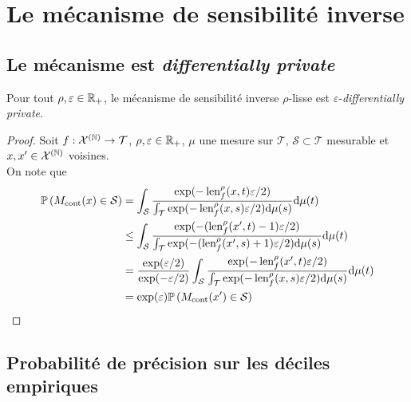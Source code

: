 \section{Le mécanisme de sensibilité inverse}

\subsection{Le mécanisme est \textit{differentially private}}\label{ISDP}

\begin{theorem}
    Pour tout \(\rho,\varepsilon \in \mathbb{R}_+\), le mécanisme de sensibilité inverse \(\rho\)-lisse est \(\varepsilon\)-\textit{differentially private}.
\end{theorem}


\begin{proof}
    Soit \(f : \mathcal X^{(\mathbb{N})} \to \mathcal T\), \(\rho, \varepsilon \in \mathbb{R}_+\), \(\mu\) une mesure sur \(\mathcal T\), \(\mathcal S \subset \mathcal T\) mesurable et \(x,x' \in \mathcal X^{(\mathbb{N})}\) voisines. \\

    On note que 
    \begin{align*}
        \mathbb P\left( M_{\text{cont}}(x) \in \mathcal S \right) & = \int_\mathcal S \dfrac{\exp(-\operatorname{len}_f^\rho(x, t)\varepsilon/2)}{\int_\mathcal T \exp(-\operatorname{len}_f^\rho(x, s)\varepsilon/2)\mathrm{d} \mu(s)}    \mathrm{d} \mu(t)\\
        & \leq \int_\mathcal S \dfrac{\exp(-(\operatorname{len}_f^\rho(x', t)-1)\varepsilon/2)}{\int_\mathcal T \exp(-(\operatorname{len}_f^\rho(x', s)+1)\varepsilon/2)\mathrm{d} \mu(s)}    \mathrm{d} \mu(t)\\
        & = \dfrac{\exp(\varepsilon/2)}{\exp(-\varepsilon/2)}\int_\mathcal S \dfrac{\exp(-\operatorname{len}_f^\rho(x', t)\varepsilon/2)}{\int_\mathcal T \exp(-\operatorname{len}_f^\rho(x, s)\varepsilon/2)\mathrm{d} \mu(s)}    \mathrm{d} \mu(t)\\
        & = \exp(\varepsilon) \mathbb P\left( M_{\text{cont}}(x') \in \mathcal S \right)
    \end{align*}
\end{proof}


\subsection{Probabilité de précision sur les déciles empiriques}\label{SI_empi}

